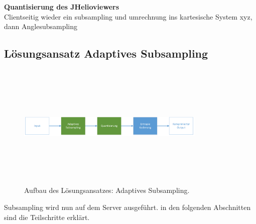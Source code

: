 \textbf{Quantisierung des JHelioviewers}\\
Clientseitig wieder ein subsampling und umrechnung ins kartesische System xyz, dann Anglesubsampling
	
\subsection{Lösungsansatz Adaptives Subsampling}
\begin{figure}[!htbp]
	\center
	\includegraphics[width=0.8\textwidth,height=6cm,keepaspectratio]{./pictures/konzept/solution0/aufbau.png}
	\caption{Aufbau des Lösungsansatzes: Adaptives Subsampling.}
	\label{konzept:loesung0:aufbau:diagramm}
\end{figure} 
Subsampling wird nun auf dem Server ausgeführt. in den folgenden Abschnitten sind die Teilschritte erklärt.

